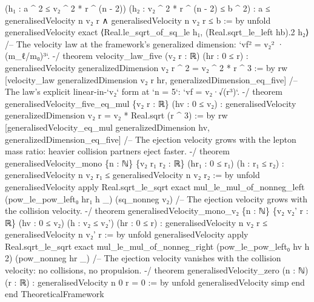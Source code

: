 \documentclass[11pt,a4paper]{article}
\begin{document}
{    (h₁ : a \textasciicircum{} 2 ≤ v₂ \textasciicircum{} 2 * r \textasciicircum{} (n - 2)) (h₂ : v₂ \textasciicircum{} 2 * r \textasciicircum{} (n - 2) ≤ b \textasciicircum{} 2) :
    a ≤ generalisedVelocity n v₂ r ∧ generalisedVelocity n v₂ r ≤ b := by
  unfold generalisedVelocity
  exact ⟨Real.le\_\allowbreak{}sqrt\_\allowbreak{}of\_\allowbreak{}sq\_\allowbreak{}le h₁, (Real.sqrt\_\allowbreak{}le\_\allowbreak{}left hb).2 h₂⟩
\mbox{}
/-- The velocity law at the framework's generalized dimension:
`vf² = v₂² · (m\_\allowbreak{}ℓ/m₀)³`. -/
theorem velocity\_\allowbreak{}law\_\allowbreak{}five (v₂ r : ℝ) (hr : 0 ≤ r) :
    generalisedVelocity generalizedDimension v₂ r \textasciicircum{} 2 = v₂ \textasciicircum{} 2 * r \textasciicircum{} 3 := by
  rw [velocity\_\allowbreak{}law generalizedDimension v₂ r hr, generalizedDimension\_\allowbreak{}eq\_\allowbreak{}five]
\mbox{}
/-- The law's explicit linear-in-`v₂` form at `n = 5`: `vf = v₂·√(r³)`. -/
theorem generalisedVelocity\_\allowbreak{}five\_\allowbreak{}eq\_\allowbreak{}mul \{v₂ r : ℝ\} (hv : 0 ≤ v₂) :
    generalisedVelocity generalizedDimension v₂ r = v₂ * Real.sqrt (r \textasciicircum{} 3) := by
  rw [generalisedVelocity\_\allowbreak{}eq\_\allowbreak{}mul generalizedDimension hv, generalizedDimension\_\allowbreak{}eq\_\allowbreak{}five]
\mbox{}
/-- The ejection velocity grows with the lepton mass ratio: heavier collision
partners eject faster. -/
theorem generalisedVelocity\_\allowbreak{}mono \{n : ℕ\} \{v₂ r₁ r₂ : ℝ\} (hr₁ : 0 ≤ r₁) (h : r₁ ≤ r₂) :
    generalisedVelocity n v₂ r₁ ≤ generalisedVelocity n v₂ r₂ := by
  unfold generalisedVelocity
  apply Real.sqrt\_\allowbreak{}le\_\allowbreak{}sqrt
  exact mul\_\allowbreak{}le\_\allowbreak{}mul\_\allowbreak{}of\_\allowbreak{}nonneg\_\allowbreak{}left (pow\_\allowbreak{}le\_\allowbreak{}pow\_\allowbreak{}left₀ hr₁ h \_\allowbreak{}) (sq\_\allowbreak{}nonneg v₂)
\mbox{}
/-- The ejection velocity grows with the collision velocity. -/
theorem generalisedVelocity\_\allowbreak{}mono\_\allowbreak{}v₂ \{n : ℕ\} \{v₂ v₂' r : ℝ\} (hv : 0 ≤ v₂) (h : v₂ ≤ v₂')
    (hr : 0 ≤ r) :
    generalisedVelocity n v₂ r ≤ generalisedVelocity n v₂' r := by
  unfold generalisedVelocity
  apply Real.sqrt\_\allowbreak{}le\_\allowbreak{}sqrt
  exact mul\_\allowbreak{}le\_\allowbreak{}mul\_\allowbreak{}of\_\allowbreak{}nonneg\_\allowbreak{}right (pow\_\allowbreak{}le\_\allowbreak{}pow\_\allowbreak{}left₀ hv h 2) (pow\_\allowbreak{}nonneg hr \_\allowbreak{})
\mbox{}
/-- The ejection velocity vanishes with the collision velocity: no collisions,
no propulsion. -/
theorem generalisedVelocity\_\allowbreak{}zero (n : ℕ) (r : ℝ) : generalisedVelocity n 0 r = 0 := by
  unfold generalisedVelocity
  simp
\mbox{}
end
\mbox{}
end TheoreticalFramework
\mbox{}
}
\end{document}
